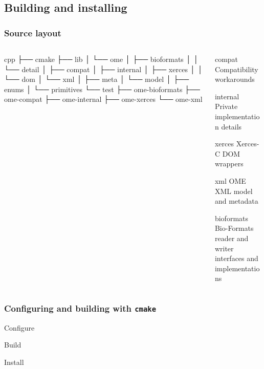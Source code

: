 \documentclass{beamer}
\begin{document}
\subsection{Building and installing}

\begin{frame}[fragile]
  \frametitle{Source layout}
  \begin{columns}
    \begin{column}{.5\linewidth}
      \begin{semiverbatim}\tiny
cpp
├── cmake
├── lib
│   └── ome
│       ├── bioformats
│       │   └── detail
│       ├── compat
│       ├── internal
│       ├── xerces
│       │   └── dom
│       └── xml
│           ├── meta
│           └── model
│               ├── enums
│               └── primitives
└── test
    ├── ome-bioformats
    ├── ome-compat
    ├── ome-internal
    ├── ome-xerces
    └── ome-xml
\end{semiverbatim}
      \end{column}
    \begin{column}{.5\linewidth}
      \begin{block}{compat}
        Compatibility workarounds
      \end{block}
      \begin{block}{internal}
        Private implementation details
      \end{block}
      \begin{block}{xerces}
        Xerces-C DOM wrappers
      \end{block}
      \begin{block}{xml}
        OME XML model and metadata
      \end{block}
      \begin{block}{bioformats}
        Bio-Formats reader and writer interfaces and implementations
      \end{block}
    \end{column}
  \end{columns}
\end{frame}

\begin{frame}[fragile]
  \frametitle{Configuring and building with \texttt{cmake}}
\begin{block}{Configure}
  \begin{semiverbatim}\footnotesize
\end{semiverbatim}
\end{block}
\begin{block}{Build}
  \begin{semiverbatim}\footnotesize
\end{semiverbatim}
\end{block}
\begin{block}{Install}
  \begin{semiverbatim}\footnotesize
\end{semiverbatim}
\end{block}
\end{frame}
\end{document}
